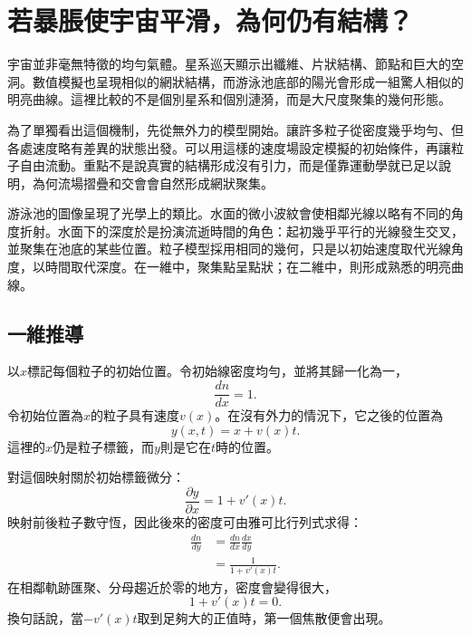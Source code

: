 \section{若暴脹使宇宙平滑，為何仍有結構？}

宇宙並非毫無特徵的均勻氣體。星系巡天顯示出纖維、片狀結構、節點和巨大的空洞。數值模擬也呈現相似的網狀結構，而游泳池底部的陽光會形成一組驚人相似的明亮曲線。這裡比較的不是個別星系和個別漣漪，而是大尺度聚集的幾何形態。

為了單獨看出這個機制，先從無外力的模型開始。讓許多粒子從密度幾乎均勻、但各處速度略有差異的狀態出發。可以用這樣的速度場設定模擬的初始條件，再讓粒子自由流動。重點不是說真實的結構形成沒有引力，而是僅靠運動學就已足以說明，為何流場摺疊和交會會自然形成網狀聚集。

\begin{classroomqa}
\end{classroomqa}

游泳池的圖像呈現了光學上的類比。水面的微小波紋會使相鄰光線以略有不同的角度折射。水面下的深度於是扮演流逝時間的角色：起初幾乎平行的光線發生交叉，並聚集在池底的某些位置。粒子模型採用相同的幾何，只是以初始速度取代光線角度，以時間取代深度。在一維中，聚集點呈點狀；在二維中，則形成熟悉的明亮曲線。

\subsection{一維推導}

以\(x\)標記每個粒子的初始位置。令初始線密度均勻，並將其歸一化為一，
\begin{equation}
\frac{dn}{dx}=1.
\label{eq:c09-initial-density}
\end{equation}
令初始位置為\(x\)的粒子具有速度\(v(x)\)。在沒有外力的情況下，它之後的位置為
\begin{equation}
y(x,t)=x+v(x)t.
\label{eq:c09-ballistic-map}
\end{equation}
這裡的\(x\)仍是粒子標籤，而\(y\)則是它在\(t\)時的位置。

對這個映射關於初始標籤微分：
\begin{equation}
\frac{\partial y}{\partial x}
=1+v'(x)t.
\label{eq:c09-jacobian}
\end{equation}
映射前後粒子數守恆，因此後來的密度可由雅可比行列式求得：
\begin{align}
\frac{dn}{dy}
&=
\frac{dn}{dx}\frac{dx}{dy}\\
&=
\frac{1}{1+v'(x)t}.
\label{eq:c09-caustic-density}
\end{align}
在相鄰軌跡匯聚、分母趨近於零的地方，密度會變得很大，
\begin{equation}
1+v'(x)t=0.
\label{eq:c09-caustic-condition}
\end{equation}
換句話說，當\(-v'(x)t\)取到足夠大的正值時，第一個焦散便會出現。

